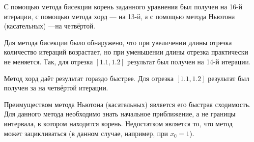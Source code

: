 С помощью метода бисекции корень заданного уравнения был получен на 16-й итерации,
с помощью метода хорд --- на 13-й,
а с помощью метода Ньютона (касательных) ---на четвёртой.

Для метода бисекции было обнаружено, что при увеличении длины отрезка количество итераций возрастает, но при уменьшении длины отрезка практически не меняется.
Так, для отрезка $ \left[ 1.1, 1.2 \right] $ результат был получен на 14-й итерации.

Метод хорд даёт результат гораздо быстрее.
Для отрезка $ \left[ 1.1, 1.2 \right] $ результат был получен за на четвёртой итерации.

Преимуществом метода Ньютона (касательных) является его быстрая сходимость.
Для данного метода необходимо знать начальное приближение, а не границы интервала, в котором находится корень.
Недостатком является то, что метод может зацикливаться (в данном случае, например, при $x_0 = 1$).


